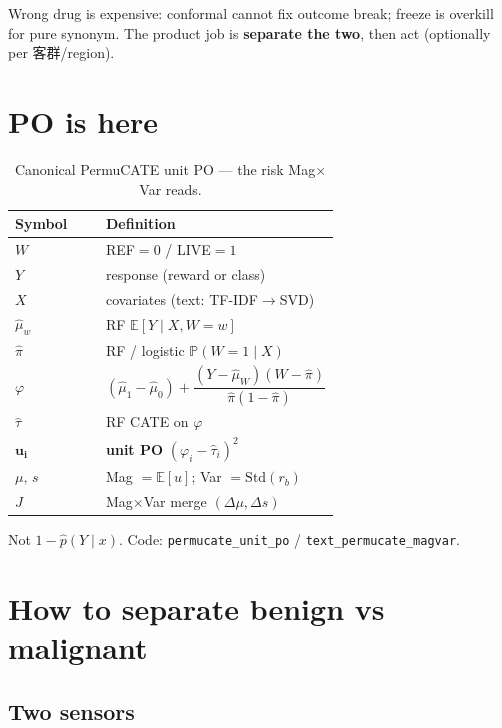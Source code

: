 \documentclass[11pt]{article}
\begin{document}
\noindent
Wrong drug is expensive: conformal cannot fix outcome break; freeze is overkill
for pure synonym. The product job is \textbf{separate the two}, then act
(optionally per 客群/region).

\section{PO is here}

\begin{table}[h]
\centering
\caption{Canonical PermuCATE unit PO --- the risk Mag$\times$Var reads.}
\label{tab:po}
\small
\begin{tabular}{@{}>{\bfseries}l p{0.72\linewidth}@{}}
\toprule
Symbol & Definition \\
\midrule
$W$ & REF$=0$ / LIVE$=1$ \\
$Y$ & response (reward or class) \\
$X$ & covariates (text: TF-IDF$\to$SVD) \\
$\hat\mu_w$ & RF $\mathbb{E}[Y\mid X,W=w]$ \\
$\hat\pi$ & RF / logistic $\mathbb{P}(W=1\mid X)$ \\
$\varphi$ &
  $(\hat\mu_1-\hat\mu_0)
  +\dfrac{(Y-\hat\mu_W)(W-\hat\pi)}{\hat\pi(1-\hat\pi)}$ \\
$\hat\tau$ & RF CATE on $\varphi$ \\
$\boldsymbol{u_i}$ & \textbf{unit PO} $(\varphi_i-\hat\tau_i)^2$ \\
$\mu,\,s$ & Mag $=\mathbb{E}[u]$; Var $=\mathrm{Std}(r_b)$ \\
$J$ & Mag$\times$Var merge $(\Delta\mu,\Delta s)$ \\
\bottomrule
\end{tabular}
\end{table}

\noindent
Not $1-\hat p(Y\mid x)$. Code: \texttt{permucate\_unit\_po} /
\texttt{text\_permucate\_magvar}.

\section{How to separate benign vs malignant}

\subsection{Two sensors}
\end{document}
